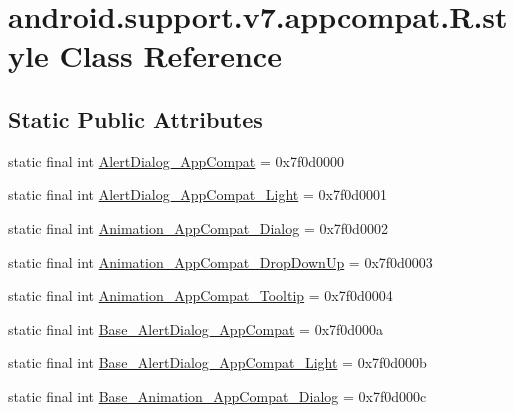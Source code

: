 \hypertarget{classandroid_1_1support_1_1v7_1_1appcompat_1_1R_1_1style}{}\section{android.\+support.\+v7.\+appcompat.\+R.\+style Class Reference}
\label{classandroid_1_1support_1_1v7_1_1appcompat_1_1R_1_1style}
\subsection*{Static Public Attributes}
\begin{DoxyCompactItemize}
\item 
static final int \mbox{\hyperlink{classandroid_1_1support_1_1v7_1_1appcompat_1_1R_1_1style_a7a80ce426bb2017e2b8138a6b04a04c8}{Alert\+Dialog\+\_\+\+App\+Compat}} = 0x7f0d0000
\item 
static final int \mbox{\hyperlink{classandroid_1_1support_1_1v7_1_1appcompat_1_1R_1_1style_a5286b0af3aae6595cd012386e576a340}{Alert\+Dialog\+\_\+\+App\+Compat\+\_\+\+Light}} = 0x7f0d0001
\item 
static final int \mbox{\hyperlink{classandroid_1_1support_1_1v7_1_1appcompat_1_1R_1_1style_adaf79da50296b63434dd1dd8d3b1e0da}{Animation\+\_\+\+App\+Compat\+\_\+\+Dialog}} = 0x7f0d0002
\item 
static final int \mbox{\hyperlink{classandroid_1_1support_1_1v7_1_1appcompat_1_1R_1_1style_a6a35f583f9c5a6779203c4ab3bb33fe6}{Animation\+\_\+\+App\+Compat\+\_\+\+Drop\+Down\+Up}} = 0x7f0d0003
\item 
static final int \mbox{\hyperlink{classandroid_1_1support_1_1v7_1_1appcompat_1_1R_1_1style_a674edc46bb999f146c7392998060e2ab}{Animation\+\_\+\+App\+Compat\+\_\+\+Tooltip}} = 0x7f0d0004
\item 
static final int \mbox{\hyperlink{classandroid_1_1support_1_1v7_1_1appcompat_1_1R_1_1style_a057db4a6871979d848f88b8529f1d73f}{Base\+\_\+\+Alert\+Dialog\+\_\+\+App\+Compat}} = 0x7f0d000a
\item 
static final int \mbox{\hyperlink{classandroid_1_1support_1_1v7_1_1appcompat_1_1R_1_1style_aaa202e250d48237fff9225fa646ff72a}{Base\+\_\+\+Alert\+Dialog\+\_\+\+App\+Compat\+\_\+\+Light}} = 0x7f0d000b
\item 
static final int \mbox{\hyperlink{classandroid_1_1support_1_1v7_1_1appcompat_1_1R_1_1style_abdb58c4283f54a5857e80fedf91b8e5f}{Base\+\_\+\+Animation\+\_\+\+App\+Compat\+\_\+\+Dialog}} = 0x7f0d000c

\end{DoxyCompactItemize}
